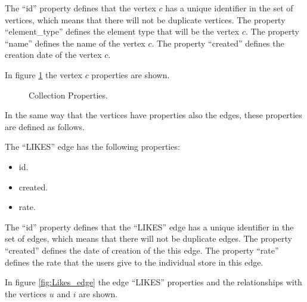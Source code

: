The “id” property defines that the vertex $c$ has a unique identifier in the set
of vertices, which means that there will not be duplicate vertices. The property
“element\_type” defines the element type that will be the vertex $c$. The
property “name” defines the name of the vertex $c$. The property “created”
defines the creation date of the vertex $c$.

In figure \ref{fig:Collection_node} the vertex $c$ properties are shown.

\begin{figure}
\captionsetup{justification=centering,margin=2cm}
\centering
\setlength\fboxsep{0pt}
\setlength\fboxrule{0.7pt}
\caption{Collection Properties.}
\label{fig:Collection_node}       
\end{figure}

In the same way that the vertices have properties also the edges, these
properties are defined as follows.

The “LIKES” edge has the following properties:

\begin{itemize} 
\item id. 
\item created. 
\item rate.
\end{itemize}

The “id” property defines that the “LIKES” edge  has a unique identifier in the
set of edges, which means that there will not be duplicate edges. The property
“created” defines the date of creation of the this edge. The property “rate”
defines the rate that the users give to the individual store in this edge.

In figure \ref{fig:Likes_edge} the edge “LIKES” properties and the relationships with the vertices $u$ and $i$ are shown.


